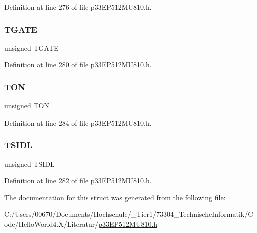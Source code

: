 Definition at line 276 of file p33\+E\+P512\+M\+U810.\+h.

\mbox{\label{structtag_t2_c_o_n_b_i_t_s_a35b6e4b591a8bd20e026168399eb0e6a}} 
\subsubsection{\texorpdfstring{T\+G\+A\+TE}{TGATE}}
{\footnotesize\ttfamily unsigned T\+G\+A\+TE}



Definition at line 280 of file p33\+E\+P512\+M\+U810.\+h.

\mbox{\label{structtag_t2_c_o_n_b_i_t_s_a8c2a094047d1019ce1c5b25ea8cff9b3}} 
\subsubsection{\texorpdfstring{T\+ON}{TON}}
{\footnotesize\ttfamily unsigned T\+ON}



Definition at line 284 of file p33\+E\+P512\+M\+U810.\+h.

\mbox{\label{structtag_t2_c_o_n_b_i_t_s_a4971b881615ef42703b5b78179fcda3d}} 
\subsubsection{\texorpdfstring{T\+S\+I\+DL}{TSIDL}}
{\footnotesize\ttfamily unsigned T\+S\+I\+DL}



Definition at line 282 of file p33\+E\+P512\+M\+U810.\+h.



The documentation for this struct was generated from the following file\+:\begin{DoxyCompactItemize}
\item 
C\+:/\+Users/00670/\+Documents/\+Hochschule/\+\_\+\+Tier1/73304\+\_\+\+Technische\+Informatik/\+Code/\+Hello\+World4.\+X/\+Literatur/\hyperlink{p33_e_p512_m_u810_8h}{p33\+E\+P512\+M\+U810.\+h}\end{DoxyCompactItemize}
